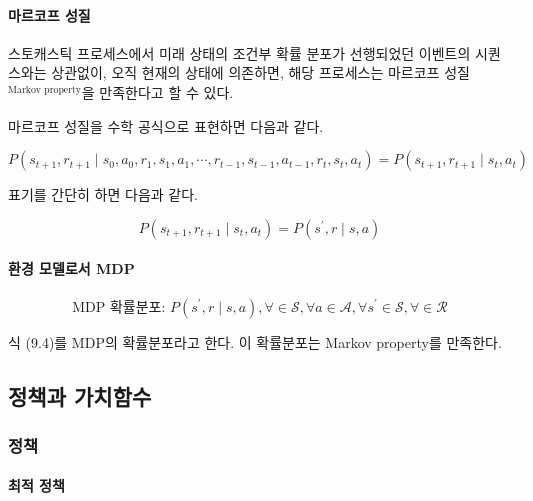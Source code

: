 \documentclass [12pt] {oblivoir}
\let\oldsubsubsection=\subsubsection
\renewcommand{\subsubsection}
{
  \filbreak
  \oldsubsubsection
}
\begin{document}
\paragraph*{마르코프 성질}\mbox{}

스토캐스틱 프로세스에서 미래 상태의 조건부 확률 분포가 선행되었던 이벤트의 시퀀스와는 상관없이, 오직 현재의 상태에 의존하면, 해당 프로세스는 마르코프 성질$^{\text{Markov property}}$을 만족한다고 할 수 있다.

마르코프 성질을 수학 공식으로 표현하면 다음과 같다.

\begin{equation} \tag{9.2}
  P(s_{t+1}, r_{t+1} \mid s_{0}, a_{0}, r_{1}, s_{1}, a_{1}, \cdots, r_{t-1}, s_{t-1}, a_{t-1}, r_{t}, s_{t}, a_{t}) = P(s_{t+1}, r_{t+1} \mid s_{t}, a_{t})
\end{equation}

표기를 간단히 하면 다음과 같다.

\begin{equation} \tag{9.3}
  P(s_{t+1}, r_{t+1} \mid s_{t}, a_{t}) = P(s^{'}, r \mid s, a)
\end{equation}

\vspace{3mm}

\paragraph*{환경 모델로서 MDP}\mbox{}

\begin{equation} \tag{9.4}
  \text{MDP 확률분포: } P(s^{'},r \mid s, a), \forall \in \mathcal{S}, \forall a \in \mathcal{A}, \forall s^{'} \in \mathcal{S}, \forall \in \mathcal{R}
\end{equation}

식 (9.4)를 MDP의 확률분포라고 한다. 이 확률분포는 Markov property를 만족한다.

\vspace{3mm}

\subsection{정책과 가치함수}

\subsubsection{정책}

\paragraph*{최적 정책}\mbox{}
\end{document}
